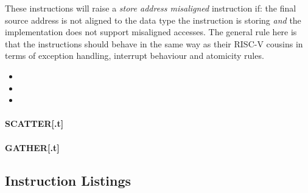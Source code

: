 These instructions will raise a {\em store address misaligned} instruction
if: the final source address is not aligned to the data type the instruction
is storing {\em and} the implementation does not support misaligned accesses.
The general rule here is that the  instructions should behave in
the same way as their RISC-V cousins in terms of exception handling,
interrupt behaviour and atomicity rules.

\begin{itemize}
\item {}
\item {}
\item {}
\end{itemize}


\paragraph{SCATTER[.t]}
\paragraph{GATHER[.t]}


\newpage
\subsection{Instruction Listings}

